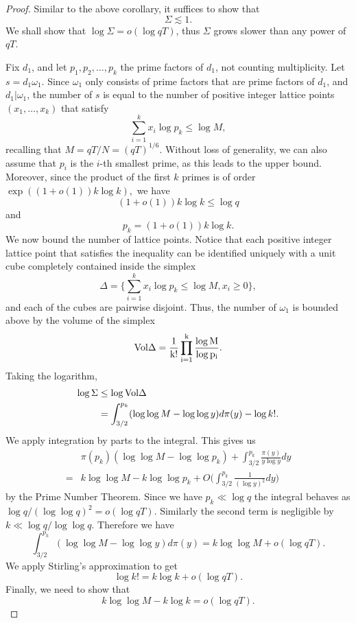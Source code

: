 \begin{proof}
    Similar to the above corollary, it suffices to show that \[
    \Sigma\lesssim 1.
    \]
    We shall show that $\log \Sigma = o(\log qT)$, thus $\Sigma$ grows slower than any power of $qT$.

    Fix $d_1$, and let $p_1,p_2,\ldots, p_k$ the prime factors of $d_1$, not counting multiplicity. Let $s=d_1\omega_1$. Since $\omega_1$ only consists of prime factors that are prime factors of $d_1$, and $d_1|\omega_1$, the number of $s$ is equal to the number of positive integer lattice points $(x_1,\dots,x_k)$ that satisfy \[
    \sum_{i=1}^{k}x_i\log p_k\leq \log M,
    \]
    recalling that $M=qT/N= (qT)^{1/6}$. Without loss of generality, we can also assume that $p_i$ is the $i$-th smallest prime, as this leads to the upper bound. Moreover, since the product of the first $k$ primes is of order $\exp((1+o(1))k\log k ),$ we have \[
    (1+o(1))k\log k \leq \log q
    \]
    and \[
    p_k = (1+o(1))k\log k.
    \]
    We now bound the number of lattice points. Notice that each positive integer lattice point that satisfies the inequality can be identified uniquely with a unit cube completely contained inside the simplex \[
    \Delta=\{\sum_{i=1}^{k}x_i\log p_k\leq \log M,x_i\geq 0\},
    \]
    and each of the cubes are pairwise disjoint. Thus, the number of $\omega_1$ is bounded above by the volume of the simplex \[
    \rm{Vol}\Delta = \frac{1}{k!}\prod_{i=1}^{k}\frac{\log M}{\log p_i}.
    \]
    Taking the logarithm, \begin{align*}
        \log \Sigma&\leq \log \rm{Vol}\Delta\\
        &=\int_{3/2}^{p_k}(\log \log M-\log \log y) d \pi(y) -\log k!.
    \end{align*}
    We apply integration by parts to the integral. This gives us\begin{align*}
    &\pi(p_k)(\log \log M -\log \log p_k)+\int_{3/2}^{p_k}\frac{\pi(y)}{y\log y}d y\\
    =&k\log \log M - k\log \log p_k + O\Big(\int_{3/2}^{p_k}\frac{1}{(\log y)^2}d y\Big)
    \end{align*}
    by the Prime Number Theorem. Since we have $p_k\ll \log q$ the integral behaves as $\log q / (\log \log q)^2 = o(\log qT)$. Similarly the second term is negligible by $k\ll \log q/\log \log q$. Therefore we have \[
        \int_{3/2}^{p_k}(\log \log M-\log \log y) d \pi(y)=k\log \log M+o(\log qT).
    \]
    We apply Stirling's approximation to get \[
    \log k! = k\log k + o(\log qT).
    \]
    Finally, we need to show that \[
    k\log \log M - k\log k =o( \log qT).
    \]
    

\end{proof}
